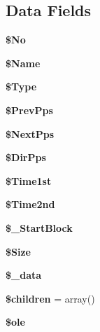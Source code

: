 \subsection*{Data Fields}
\begin{DoxyCompactItemize}
\item 
{\bfseries \$\+No}\label{class_p_h_p_excel___shared___o_l_e___p_p_s_acf452b3b58cda18bf4e2f797fdaeaeac}

\item 
{\bfseries \$\+Name}\label{class_p_h_p_excel___shared___o_l_e___p_p_s_a90efb261c13e9a3e16ed2b0563dec08d}

\item 
{\bfseries \$\+Type}\label{class_p_h_p_excel___shared___o_l_e___p_p_s_adbca55da4197c2078a3b59e0ff027461}

\item 
{\bfseries \$\+Prev\+Pps}\label{class_p_h_p_excel___shared___o_l_e___p_p_s_a0e64448949671d863bc6f38dcfcaee4c}

\item 
{\bfseries \$\+Next\+Pps}\label{class_p_h_p_excel___shared___o_l_e___p_p_s_a8c52f0d0156c12322c51cae2c0962084}

\item 
{\bfseries \$\+Dir\+Pps}\label{class_p_h_p_excel___shared___o_l_e___p_p_s_afff49823b66829a3a709ebbc3172e2d6}

\item 
{\bfseries \$\+Time1st}\label{class_p_h_p_excel___shared___o_l_e___p_p_s_adb5deafa1efa5aa7637aaf29a16d1617}

\item 
{\bfseries \$\+Time2nd}\label{class_p_h_p_excel___shared___o_l_e___p_p_s_a5a39b021faf1b1ecdc8a126e99243f2e}

\item 
{\bfseries \$\+\_\+\+Start\+Block}\label{class_p_h_p_excel___shared___o_l_e___p_p_s_abcc8eff6c046aecac887e237d8a06f7a}

\item 
{\bfseries \$\+Size}\label{class_p_h_p_excel___shared___o_l_e___p_p_s_ad06a25b644c6b64c025be83d9735894e}

\item 
{\bfseries \$\+\_\+data}\label{class_p_h_p_excel___shared___o_l_e___p_p_s_a5a3006290f2de94fff2dd63ca739d15a}

\item 
{\bfseries \$children} = array()\label{class_p_h_p_excel___shared___o_l_e___p_p_s_aafda1a84fe840800c9884c167093f759}

\item 
{\bfseries \$ole}\label{class_p_h_p_excel___shared___o_l_e___p_p_s_a87048ace5ace790855de1f5ddde31e0a}

\end{DoxyCompactItemize}



